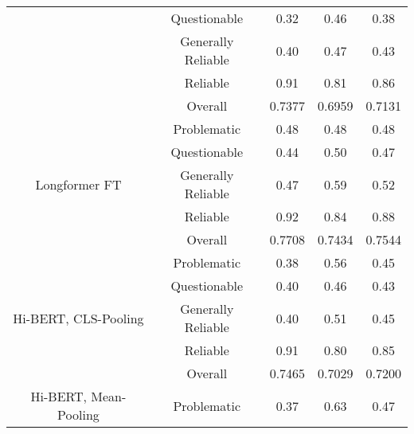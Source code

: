\begin{table}[htbp]
\begin{longtable}{| c | c | c | c | c |}
                                                          & Questionable       & 0.32               & 0.46            & 0.38            \\
                                                          & Generally Reliable & 0.40               & 0.47            & 0.43            \\
                                                          & Reliable           & 0.91               & 0.81            & 0.86            \\\cline{2-5}
                                                          & Overall            & 0.7377             & 0.6959          & 0.7131          \\
        \hline
        \multirow{5}{*}{Longformer FT}                    & Problematic        & 0.48               & 0.48            & 0.48            \\
                                                          & Questionable       & 0.44               & 0.50            & 0.47            \\
                                                          & Generally Reliable & 0.47               & 0.59            & 0.52            \\
                                                          & Reliable           & 0.92               & 0.84            & 0.88            \\\cline{2-5}
                                                          & Overall            & 0.7708             & 0.7434          & 0.7544          \\
        \hline
        \multirow{5}{*}{Hi-BERT, CLS-Pooling}             & Problematic        & 0.38               & 0.56            & 0.45            \\
                                                          & Questionable       & 0.40               & 0.46            & 0.43            \\
                                                          & Generally Reliable & 0.40               & 0.51            & 0.45            \\
                                                          & Reliable           & 0.91               & 0.80            & 0.85            \\\cline{2-5}
                                                          & Overall            & 0.7465             & 0.7029          & 0.7200          \\
        \hline
        \multirow{5}{*}{Hi-BERT, Mean-Pooling}            & Problematic        & 0.37               & 0.63            & 0.47            \\

\end{longtable}
\end{table}
